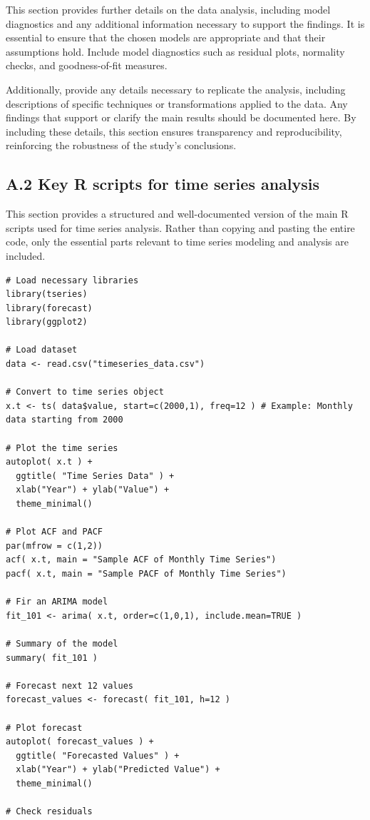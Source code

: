\documentclass[11pt]{article}
\def\spacingset#1{\renewcommand{\baselinestretch}{#1}\small\normalsize}
\begin{document}
This section provides further details on the data analysis, including model diagnostics and any additional information necessary to support the findings. It is essential to ensure that the chosen models are appropriate and that their assumptions hold. Include model diagnostics such as residual plots, normality checks, and goodness-of-fit measures.

Additionally, provide any details necessary to replicate the analysis, including descriptions of specific techniques or transformations applied to the data. Any findings that support or clarify the main results should be documented here. By including these details, this section ensures transparency and reproducibility, reinforcing the robustness of the study's conclusions.

\subsection*{A.2 Key R scripts for time series analysis}

This section provides a structured and well-documented version of the main \textsf{R} scripts used for time series analysis. Rather than copying and pasting the entire code, only the essential parts relevant to time series modeling and analysis are included.

{\footnotesize
\begin{verbatim}
# Load necessary libraries
library(tseries)
library(forecast)
library(ggplot2)

# Load dataset
data <- read.csv("timeseries_data.csv")

# Convert to time series object
x.t <- ts( data$value, start=c(2000,1), freq=12 ) # Example: Monthly data starting from 2000

# Plot the time series
autoplot( x.t ) +
  ggtitle( "Time Series Data" ) +
  xlab("Year") + ylab("Value") +
  theme_minimal()

# Plot ACF and PACF
par(mfrow = c(1,2))
acf( x.t, main = "Sample ACF of Monthly Time Series")
pacf( x.t, main = "Sample PACF of Monthly Time Series")

# Fir an ARIMA model
fit_101 <- arima( x.t, order=c(1,0,1), include.mean=TRUE )

# Summary of the model
summary( fit_101 )

# Forecast next 12 values
forecast_values <- forecast( fit_101, h=12 )

# Plot forecast
autoplot( forecast_values ) +
  ggtitle( "Forecasted Values" ) +
  xlab("Year") + ylab("Predicted Value") +
  theme_minimal()

# Check residuals
\end{verbatim}
}

\spacingset{1.1}




\end{document}
